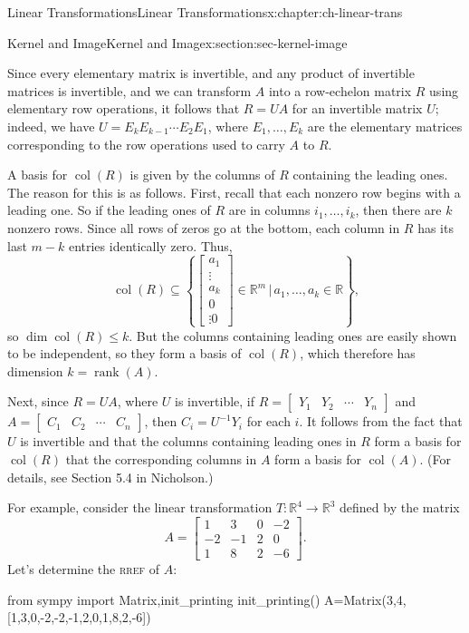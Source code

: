 \documentclass[oneside,10pt,]{book}
\newcommand{\initialism}[1]{\textsc{\MakeLowercase{#1}}}
\numberwithin{equation}{section}
\newcommand{\bbm}{\begin{bmatrix}}
\newcommand{\ebm}{\end{bmatrix}}
\newcommand{\R}{\mathbb{R}}
\newcommand{\csp}{\operatorname{col}}
\newcommand{\amp}{&}
\begin{document}
\begin{chapterptx}{Linear Transformations}{}{Linear Transformations}{}{}{x:chapter:ch-linear-trans}
\begin{sectionptx}{Kernel and Image}{}{Kernel and Image}{}{}{x:section:sec-kernel-image}
\par
Since every elementary matrix is invertible, and any product of invertible matrices is invertible, and we can transform \(A\) into a row-echelon matrix \(R\) using elementary row operations, it follows that \(R = UA\) for an invertible matrix \(U\); indeed, we have \(U = E_kE_{k-1}\cdots E_2E_1\), where \(E_1,\ldots, E_k\) are the elementary matrices corresponding to the row operations used to carry \(A\) to \(R\).%
\par
A basis for \(\csp(R)\) is given by the columns of \(R\) containing the leading ones. The reason for this is as follows. First, recall that each nonzero row begins with a leading one. So if the leading ones of \(R\) are in columns \(i_1,\ldots, i_k\), then there are \(k\) nonzero rows. Since all rows of zeros go at the bottom, each column in \(R\) has its last \(m-k\) entries identically zero. Thus,%
\begin{equation*}
\csp(R)\subseteq \left\{\bbm a_1\\\vdots \\a_k\\0\\\vdots 0\ebm\in \R^m \,|\, a_1,\ldots, a_k\in\R\right\}\text{,}
\end{equation*}
so \(\dim \csp(R)\leq k\). But the columns containing leading ones are easily shown to be independent, so they form a basis of \(\csp(R)\), which therefore has dimension \(k=\operatorname{rank}(A)\).%
\par
Next, since \(R=UA\), where \(U\) is invertible, if \(R=\bbm Y_1\amp Y_2\amp \cdots \amp Y_n\ebm\) and \(A = \bbm C_1\amp C_2\amp \cdots \amp C_n\ebm\), then \(C_i = U^{-1}Y_i\) for each \(i\). It follows from the fact that \(U\) is invertible and that the columns containing leading ones in \(R\) form a basis for \(\csp(R)\) that the corresponding columns in \(A\) form a basis for \(\csp(A)\). (For details, see Section 5.4 in Nicholson.)%
\par
For example, consider the linear transformation \(T:\R^4\to \R^3\) defined by the matrix%
\begin{equation*}
A = \bbm 1 \amp 3 \amp 0 \amp -2\\
-2 \amp -1 \amp 2 \amp 0\\
1 \amp 8 \amp 2 \amp -6\ebm\text{.}
\end{equation*}
Let's determine the \initialism{RREF} of \(A\):%
\begin{sageinput}
from sympy import Matrix,init_printing
init_printing()
A=Matrix(3,4,[1,3,0,-2,-2,-1,2,0,1,8,2,-6])

\end{sageinput}
\end{sectionptx}
\end{chapterptx}
\end{document}
